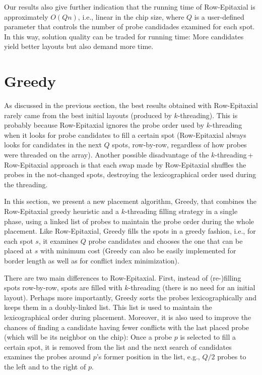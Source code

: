 Our results also give further indication that the running time of Row-Epitaxial
is approximately $O(Qn)$, i.e., linear in the chip size, where $Q$ is a
user-defined parameter that controls the number of probe candidades examined for
each spot. In this way, solution quality can be traded for running time: More
candidates yield better layouts but also demand more time.

\section{Greedy}
\label{sec:placement_greedy}

As discussed in the previous section, the best results obtained with
Row-Epitaxial rarely came from the best initial layouts (produced by
$k$-threading). This is probably because Row-Epitaxial ignores the probe order
used by $k$-threading when it looks for probe candidates to fill a certain spot
(Row-Epitaxial always looks for candidates in the next $Q$ spots, row-by-row,
regardless of how probes were threaded on the array). Another possible
disadvantage of the $k$-threading\,+\,Row-Epitaxial approach is that each swap
made by Row-Epitaxial shuffles the probes in the not-changed spots, destroying
the lexicographical order used during the threading.

In this section, we present a new placement algorithm, Greedy, that combines the
Row-Epitaxial greedy heuristic and a $k$-threading filling strategy in a single
phase, using a linked list of probes to maintain the probe order during the
whole placement. Like Row-Epitaxial, Greedy fills the spots in a greedy fashion,
i.e., for each spot $s$, it examines $Q$ probe candidates and chooses the one
that can be placed at $s$ with minimum cost (Greedy can also be easily
implemented for border length as well as for conflict index minimization).

There are two main differences to Row-Epitaxial. First, instead of (re-)filling
spots row-by-row, spots are filled with $k$-threading (there is no need for an
initial layout). Perhaps more importantly, Greedy sorts the probes
lexicographically and keeps them in a doubly-linked list. This list is used to
maintain the lexicographical order during placement. Moreover, it is also used
to improve the chances of finding a candidate having fewer conflicts with the
last placed probe (which will be its neighbor on the chip): Once a probe $p$ is
selected to fill a certain spot, it is removed from the list and the next search
of candidates examines the probes around $p$'s former position in the list,
e.g., $Q/2$ probes to the left and to the right of $p$.


